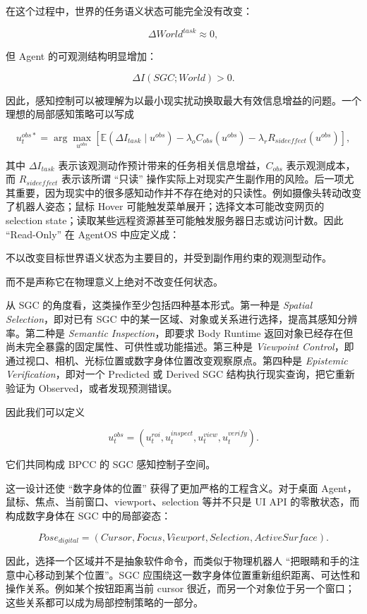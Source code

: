 在这个过程中，世界的任务语义状态可能完全没有改变：

\[
\Delta World^{task}
\approx0,
\]

但 Agent 的可观测结构明显增加：

\[
\Delta I(SGC;World)>0.
\]

因此，感知控制可以被理解为以最小现实扰动换取最大有效信息增益的问题。一个理想的局部感知策略可以写成

\[
u_{t}^{obs*}
=
\arg\max_{u^{obs}}
\left[
\mathbb E
\left(
\Delta I_{task}
\mid
u^{obs}
\right)
-
\lambda_o C_{obs}(u^{obs})
-
\lambda_r R_{sideeffect}(u^{obs})
\right],
\]

其中 $\Delta I_{task}$ 表示该观测动作预计带来的任务相关信息增益，$C_{obs}$ 表示观测成本，而 $R_{sideeffect}$ 表示该所谓 ``只读'' 操作实际上对现实产生副作用的风险。后一项尤其重要，因为现实中的很多感知动作并不存在绝对的只读性。例如摄像头转动改变了机器人姿态；鼠标 Hover 可能触发菜单展开；选择文本可能改变网页的 selection state；读取某些远程资源甚至可能触发服务器日志或访问计数。因此 ``Read-Only'' 在 AgentOS 中应定义成：

\begin{definition*}
不以改变目标世界语义状态为主要目的，并受到副作用约束的观测型动作。
\end{definition*}

而不是声称它在物理意义上绝对不改变任何状态。

从 SGC 的角度看，这类操作至少包括四种基本形式。第一种是 \emph{Spatial Selection}，即对已有 SGC 中的某一区域、对象或关系进行选择，提高其感知分辨率。第二种是 \emph{Semantic Inspection}，即要求 Body Runtime 返回对象已经存在但尚未完全暴露的固定属性、可供性或功能描述。第三种是 \emph{Viewpoint Control}，即通过视口、相机、光标位置或数字身体位置改变观察原点。第四种是 \emph{Epistemic Verification}，即对一个 Predicted 或 Derived SGC 结构执行现实查询，把它重新验证为 Observed，或者发现预测错误。

因此我们可以定义

\[
u_t^{obs}
=
\left(
u_t^{roi},
u_t^{inspect},
u_t^{view},
u_t^{verify}
\right).
\]

它们共同构成 BPCC 的 SGC 感知控制子空间。

这一设计还使 ``数字身体的位置'' 获得了更加严格的工程含义。对于桌面 Agent，鼠标、焦点、当前窗口、viewport、selection 等并不只是 UI API 的零散状态，而构成数字身体在 SGC 中的局部姿态：

\[
Pose_{digital}
=
(
Cursor,
Focus,
Viewport,
Selection,
ActiveSurface
).
\]

因此，选择一个区域并不是抽象软件命令，而类似于物理机器人 ``把眼睛和手的注意中心移动到某个位置''。SGC 应围绕这一数字身体位置重新组织距离、可达性和操作关系。例如某个按钮距离当前 cursor 很近，而另一个对象位于另一个窗口；这些关系都可以成为局部控制策略的一部分。

